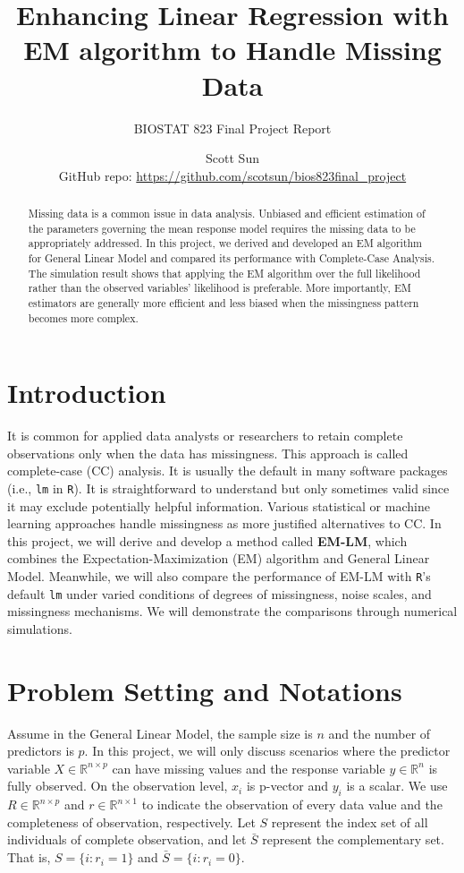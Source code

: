 \documentclass[
  twocolumn]{article}
\title{\textbf{Enhancing Linear Regression with EM algorithm to Handle
Missing Data}}
\subtitle{BIOSTAT 823 Final Project Report}
\author{Scott Sun\\
GitHub repo: \url{https://github.com/scotsun/bios823final_project}}
\date{}
\begin{document}
\maketitle
\begin{abstract}
Missing data is a common issue in data analysis. Unbiased and efficient
estimation of the parameters governing the mean response model requires
the missing data to be appropriately addressed. In this project, we
derived and developed an EM algorithm for General Linear Model and
compared its performance with Complete-Case Analysis. The simulation
result shows that applying the EM algorithm over the full likelihood
rather than the observed variables' likelihood is preferable. More
importantly, EM estimators are generally more efficient and less biased
when the missingness pattern becomes more complex.
\end{abstract}

\hypertarget{introduction}{%
\section{Introduction}\label{introduction}}

It is common for applied data analysts or researchers to retain complete
observations only when the data has missingness. This approach is called
complete-case (CC) analysis. It is usually the default in many software
packages (i.e., \texttt{lm} in \texttt{R}). It is straightforward to
understand but only sometimes valid since it may exclude potentially
helpful information. Various statistical or machine learning approaches
handle missingness as more justified alternatives to CC. In this
project, we will derive and develop a method called \textbf{EM-LM},
which combines the Expectation-Maximization (EM) algorithm and General
Linear Model. Meanwhile, we will also compare the performance of EM-LM
with \texttt{R}'s default \texttt{lm} under varied conditions of degrees
of missingness, noise scales, and missingness mechanisms. We will
demonstrate the comparisons through numerical simulations.

\hypertarget{problem-setting-and-notations}{%
\section{Problem Setting and
Notations}\label{problem-setting-and-notations}}

Assume in the General Linear Model, the sample size is \(n\) and the
number of predictors is \(p\). In this project, we will only discuss
scenarios where the predictor variable \(X \in \mathbb{R}^{n \times p}\)
can have missing values and the response variable \(y \in \mathbb{R}^n\)
is fully observed. On the observation level, \(x_i\) is p-vector and
\(y_i\) is a scalar. We use \(R \in \mathbb{R}^{n \times p}\) and
\(r \in \mathbb{R}^{n \times 1}\) to indicate the observation of every
data value and the completeness of observation, respectively. Let \(S\)
represent the index set of all individuals of complete observation, and
let \(\bar{S}\) represent the complementary set. That is,
\(S = \{i: r_i = 1\}\) and \(\bar{S} = \{i: r_i = 0\}\).
\end{document}
